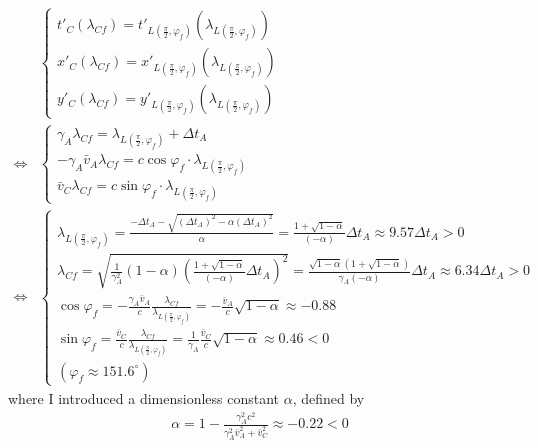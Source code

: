 \documentclass[12pt]{article}
\begin{document}
\begin{align*}
&\left\{
\begin{array}{l}
t'_{C}(\lambda_{Cf}) = t'_{L(\frac{\pi}{2},\varphi_f)}(\lambda_{L(\frac{\pi}{2},\varphi_f)})\\[1em]
x'_{C}(\lambda_{Cf}) = x'_{L(\frac{\pi}{2},\varphi_f)}(\lambda_{L(\frac{\pi}{2},\varphi_f)})\\[1em]
y'_{C}(\lambda_{Cf}) = y'_{L(\frac{\pi}{2},\varphi_f)}(\lambda_{L(\frac{\pi}{2},\varphi_f)}) 
\end{array}
\right.\\[1em]
\Leftrightarrow
&\left\{
\begin{array}{l}
\gamma_A \lambda_{Cf} = \lambda_{L(\frac{\pi}{2},\varphi_f)} + \Delta t_A\\[1em]
- \gamma_A \bar{v}_A \lambda_{Cf} = c \cos{\varphi_f} \cdot \lambda_{L(\frac{\pi}{2},\varphi_f)}\\[1em]
\bar{v}_C \lambda_{Cf} = c \sin{\varphi_f} \cdot \lambda_{L(\frac{\pi}{2},\varphi_f)}
\end{array}
\right.\\[1em]
\Leftrightarrow 
&\left\{
\begin{array}{l}
\lambda_{L(\frac{\pi}{2},\varphi_f)} = \frac{- \Delta t_A - \sqrt{\left(\Delta t_A\right)^2 - \alpha \left(\Delta t_A\right)^2}}{\alpha} = \frac{1 + \sqrt{1 - \alpha}}{(-\alpha)} \Delta t_A \approx 9.57 \Delta t_A > 0\\[1em]
\lambda_{Cf} = \sqrt{\frac{1}{\gamma_A^2} \left( 1 - \alpha \right) \left(\frac{1 + \sqrt{1 - \alpha}}{(-\alpha)} \Delta t_A \right)^2} = \frac{\sqrt{1 - \alpha} \left( 1 + \sqrt{1 - \alpha} \right)}{\gamma_A (-\alpha)} \Delta t_A  \approx 6.34 \Delta t_A > 0\\[1em]
\cos{\varphi_f} = - \frac{\gamma_A \bar{v}_A}{c} \frac{\lambda_{Cf}}{\lambda_{L(\frac{\pi}{2},\varphi_f)}} = - \frac{\bar{v}_A}{c} \sqrt{1 - \alpha} \approx -0.88\\[1em]
\sin{\varphi_f} = \frac{\bar{v}_C}{c} \frac{\lambda_{Cf}}{\lambda_{L(\frac{\pi}{2},\varphi_f)}} = \frac{1}{\gamma_A} \frac{\bar{v}_C}{c} \sqrt{1 - \alpha} \approx 0.46 < 0\\[1em]
\left(\varphi_f \approx 151.6^{\circ}\right)
\end{array}
\right.
\end{align*}
where I introduced a dimensionless constant $\alpha$, defined by
\begin{gather*}
\alpha = 1 - \frac{\gamma_A^2 c^2}{\gamma_A^2 \bar{v}_A^2 + \bar{v}_C^2} \approx - 0.22 < 0
\end{gather*}
\end{document}
